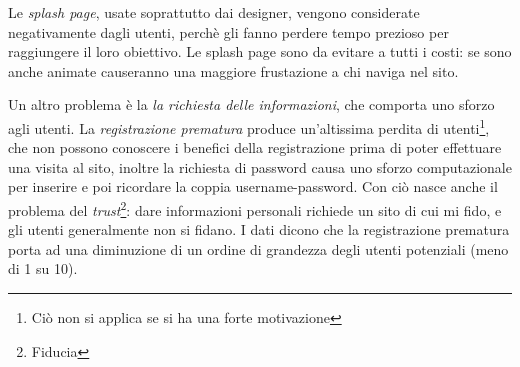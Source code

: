 Le \textit{splash page}, usate soprattutto dai designer, vengono considerate negativamente dagli utenti, perch\`e gli fanno perdere tempo prezioso per raggiungere il loro obiettivo. Le splash page sono da evitare a tutti i costi: se sono anche animate causeranno una maggiore frustazione a chi naviga nel sito.

Un altro problema \`e la \textit{la richiesta delle informazioni}, che comporta uno sforzo agli utenti. La \textit{registrazione prematura} produce un'altissima perdita di utenti\footnote{Ci\`o non si applica se si ha una forte motivazione}, che non possono conoscere i benefici della registrazione prima di poter effettuare una visita al sito, inoltre la richiesta di password causa uno sforzo computazionale per inserire e poi ricordare la coppia username-password. Con ci\`o nasce anche il problema del \textit{trust}\footnote{Fiducia}: dare informazioni personali richiede un sito di cui mi fido, e gli utenti generalmente non si fidano. I dati dicono che la registrazione prematura porta ad una diminuzione di un ordine di grandezza degli utenti potenziali (meno di 1 su 10).

